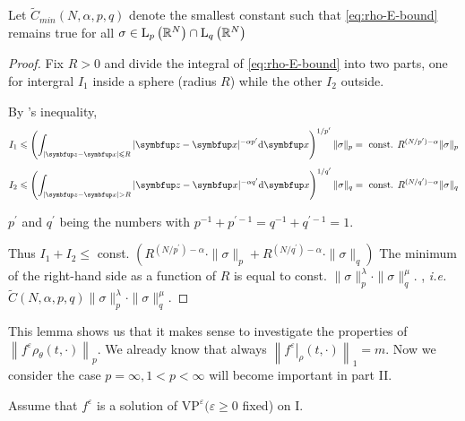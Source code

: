 \begin{lemma}
\begin{lemma}
Let $\tilde{C}_{min}(N, \alpha, p, q)$ denote the smallest constant such that \eqref{eq:rho-E-bound} remains true for all $\sigma \in \mathrm{L}_{p}\left({\mathbb{R}}^{N}\right) \cap \mathrm{L}_{q}\left({\mathbb{R}}^{N}\right)$
\end{lemma}

\begin{proof}
    Fix $R>0$ and divide the integral of \eqref{eq:rho-E-bound} into two parts, one for intergral $I_1$ inside a sphere (radius $R$) while the other $I_2$ outside.
    
By \Holder's inequality,
$$
I_{1} \leqslant \left( \int_{|\vect{z}-\vx|\leqslant R} |\vect{z}-\vx|^{-\alpha p^{\prime}}\mathrm{d}\vx \right)^{1/p^{\prime}} \|\sigma\|_{p}
= \text{ const. } R^{(N / p^{\prime})-\alpha} \|\sigma\|_{p}
$$
$$
I_{2} \leqslant \left( \int_{|\vect{z}-\vx|> R} |\vect{z}-\vx|^{-\alpha q^{\prime}}\mathrm{d}\vx \right)^{1/q^{\prime}} \|\sigma\|_{q}
= \text{ const. } R^{(N / q^{\prime})-\alpha} \|\sigma\|_{q}
$$

$p^{\prime}$ and $q^{\prime}$ being the numbers with $p^{-1}+p^{\prime-1}=q^{-1}+q^{\prime-1}=1$.

Thus $I_{1}+I_{2} \leqslant$ const. $\left(R^{\left(N / p^{\prime}\right)-\alpha} \cdot\|\sigma\|_{p}+R^{\left(N / q^{\prime}\right)-\alpha} \cdot\|\sigma\|_{q}\right)$
The minimum of the right-hand side as a function of $R$ is equal to const. $\|\sigma\|_{p}^{\lambda} \cdot\|\sigma\|_{q}^{\mu} .$ , \textit{i.e.} $\tilde{C}(N,\alpha, p, q)\|\sigma\|_{p}^{\lambda} \cdot\|\sigma\|_{q}^{\mu}  $.
\end{proof}

This lemma shows us that it makes sense to investigate the properties of $\left\|f^{\varepsilon} \rho_{\theta}(t, \cdot)\right\|_{p} .$ We already know that always $\left\|\left.f^{\varepsilon}\right|_{\rho}(t, \cdot)\right\|_{1}=m .$ Now we consider the case $p=\infty, 1<p<\infty$ will become important in part II.


\begin{assumption}

    Assume that $f^{\varepsilon}$ is a solution of $\text{VP}^{\varepsilon}(\varepsilon \geqslant 0$ fixed) on I. 
    

\end{assumption}
\end{lemma}
